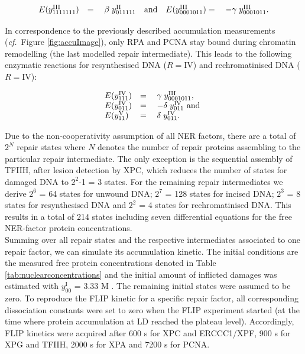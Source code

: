 \begin{align*}
\begin{array}{l l llll}
E(y_{1111111}^\text{III})&=&\;	\beta \;	y_{011111}^\text{II}	 \quad \text{and}
&E(y_{0001011}^\text{III})=&\;	-\gamma	\;y_{0001011}^\text{III}.	 \\
\end{array}
\end{align*}

In correspondence to the previously described accumulation measurements (\textit{cf.}\ Figure \ref{fig:accuImage}), only RPA and PCNA stay bound during chromatin remodelling (the last modelled repair intermediate). This leads to the following enzymatic reactions for resynthesised DNA  ($R= \text{IV}$) and rechromatinised DNA ($R= \text{IV}$):


\begin{align*}
\begin{array}{l l llll}
E(y_{111}^\text{IV})&=&\;	\gamma \;	y_{0001011}^\text{III},\\	 
E(y_{011}^\text{IV})&=&\;	-\delta	\;y_{011}^\text{IV} \text{ and }	 \\
 E(y_{11}^\text{V})&=&\;	\delta	\;y_{011}^\text{IV}.
\end{array}
\end{align*}

Due to the non-cooperativity assumption of all NER factors, there are a total of $\text{2}^N$ repair states where $N$ denotes the number of repair proteins assembling to the particular repair intermediate. The only exception is the sequential assembly of TFIIH, after lesion detection by XPC, which reduces the number of states for damaged DNA to $\text{2}^\text{2}$-1 = 3 states. For the remaining repair intermediates we derive  $\text{2}^\text{6}$ = 64 states for unwound DNA;  $\text{2}^\text{7}$ = 128 states for incised DNA; $\text{2}^\text{3}$ = 8 states for resynthesised DNA and $\text{2}^\text{2}$ = 4 states for rechromatinised DNA. This results in a total of 214 states including seven differential equations for the free NER-factor protein concentrations. \\
Summing over all repair states and the respective intermediates associated to one repair factor, we can simulate its accumulation kinetic. The initial conditions are the measured free protein concentrations denoted in Table \ref{tab:nuclearconcentrations}\cite{Terstiege2010,Luijsterburg2010} and the initial amount of inflicted damages was estimated with  $y_{00}^{\text{I}}$ = 3.33 \textmu M \cite{Verbruggen2014}. The remaining initial states were assumed to be zero. To reproduce the FLIP kinetic for a specific repair factor, all corresponding dissociation constants were set to zero when the FLIP experiment started (at the time where protein accumulation at LD reached the plateau level). Accordingly, FLIP kinetics were acquired after 600 s for XPC and ERCCC1/XPF, 900 s for XPG and TFIIH, 2000 s for XPA and 7200 s for PCNA. 


